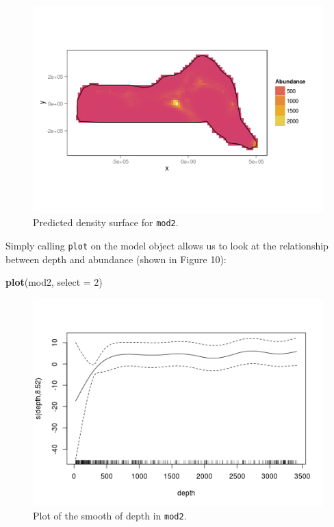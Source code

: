 \documentclass[]{amsart}
\makeatletter
\newenvironment{Shaded}{}{}
\newcommand{\KeywordTok}[1]{\textcolor[rgb]{0.00,0.44,0.13}{\textbf{{#1}}}}
\newcommand{\DataTypeTok}[1]{\textcolor[rgb]{0.56,0.13,0.00}{{#1}}}
\newcommand{\DecValTok}[1]{\textcolor[rgb]{0.25,0.63,0.44}{{#1}}}
\newcommand{\NormalTok}[1]{{#1}}
\def\maxwidth{\ifdim\Gin@nat@width>\linewidth\linewidth
\else\Gin@nat@width\fi}
\let\Oldincludegraphics\includegraphics
\renewcommand{\includegraphics}[1]{\Oldincludegraphics[width=\maxwidth]{#1}}
\makeatother
\begin{document}
\begin{figure}[htbp]
\centering
\includegraphics{mexico-figs/mod2-preds.png}
\caption{Predicted density surface for \texttt{mod2}.}
\end{figure}

Simply calling \texttt{plot} on the model object allows us to look at
the relationship between depth and abundance (shown in Figure 10):

\begin{Shaded}
\begin{Highlighting}[]
\KeywordTok{plot}\NormalTok{(mod2, }\DataTypeTok{select =} \DecValTok{2}\NormalTok{)}
\end{Highlighting}
\end{Shaded}

\begin{figure}[htbp]
\centering
\includegraphics{mexico-figs/mod2-depth.png}
\caption{Plot of the smooth of depth in \texttt{mod2}.}
\end{figure}
\end{document}
